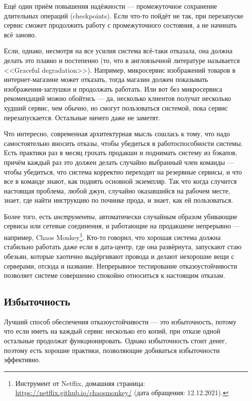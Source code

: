\documentclass[a5paper]{article}
\begin{document}
Ещё один приём повышения надёжности --- промежуточное сохранение длительных операций (checkpoints). Если что-то пойдёт не так, при перезапуске сервис сможет продолжить работу с промежуточного состояния, а не начинать всё заново.

Если, однако, несмотря на все усилия система всё-таки отказала, она должна делать это плавно и постепенно (то, что в англоязычной литературе называется <<Graceful degradation>>). Например, микросервис изображений товаров в интернет-магазине может отказать, тогда магазин должен показывать изображения-заглушки и продолжать работать. Или вот без микросервиса рекомендаций можно обойтись --- да, несколько клиентов получат несколько худший сервис, чем обычно, но смогут пользоваться системой, пока сервис перезапускается. Остальные ничего даже не заметят.

Что интересно, современная архитектурная мысль сошлась к тому, что надо самостоятельно вносить отказы, чтобы убедиться в работоспособности системы. Есть практики раз в месяц грохать продакшн и поднимать систему из бэкапов, причём каждый раз это должен делать случайно выбранный член команды --- чтобы убедиться, что система корректно переходит на резервные сервисы, и что все в команде знают, как поднять основной экземпляр. Так что когда случится настоящая проблема, любой джун, случайно оказавшийся на рабочем месте, знает, где найти инструкцию по починке прода, и знает, как ей пользоваться.

Более того, есть \emph{инструменты}, автоматически случайным образом убивающие сервисы или сетевые соединения, и работающие на продакшене непрерывно --- например, Chaos Monkey\footnote{Инструмент от Netflix, домашняя страница: \url{https://netflix.github.io/chaosmonkey/} (дата обращения: 12.12.2021).}. Кто-то говорил, что хорошая система должна стабильно работать даже если в дата-центр, где она развёрнута, запускают стаю обезьян, которые хаотично выдёргивают провода и делают нехорошие вещи с серверами, отсюда и название. Непрерывное тестирование отказоустойчивости позволяет системе совершенно спокойно относиться к настоящим отказам.

\subsection{Избыточность}

Лучший способ обеспечения отказоустойчивости --- это избыточность, потому что если иметь на каждый сервис несколько его копий, при отказе одной остальные продолжат функционировать. Однако избыточность стоит денег, поэтому есть хорошие практики, позволяющие добиваться избыточности эффективно.
\end{document}
